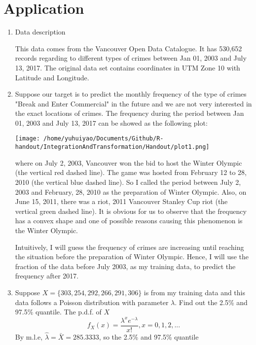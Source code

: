 \section{Application}
\begin{enumerate}
	\item Data description\cite{civ17}
	\par This data comes from the Vancouver Open Data Catalogue. It has 530,652 records regarding to different types of crimes between Jan 01, 2003 and July 13, 2017. The original data set contains coordinates in UTM Zone 10 with Latitude and Longitude. 
	\item Suppose our target is to predict the monthly frequency of the type of crimes "Break and Enter Commercial" in the future and we are not very interested in the exact locations of crimes. The frequency during the period between Jan 01, 2003 and July 13, 2017 can be showed as the following plot:
	\begin{center}
		\texttt{[image: /home/yuhuiyao/Documents/Github/R-handout/IntegrationAndTransformation/Handout/plot1.png]}
	\end{center}
	where on July 2, 2003, Vancouver won the bid to host the Winter Olympic (the vertical red dashed line). The game was hosted from February 12 to 28, 2010 (the vertical blue dashed line). So I called the period between July 2, 2003 and February, 28, 2010 as the preparation of Winter Olympic. Also, on June 15, 2011, there was a riot, 2011 Vancouver Stanley Cup riot (the vertical green dashed line). It is obvious for us to observe that the frequency has a convex shape and one of possible reasons causing this phenomenon is the Winter Olympic. 
	\par Intuitively, I will guess the frequency of crimes are increasing until reaching the situation before the preparation of Winter Olympic. Hence, I will use the fraction of the data before July 2003, as my training data, to predict the frequency after 2017.
	\item
	\par Suppose $X = \{303, 254, 292, 266, 291, 306\}$ is from my training data and this data follows a Poisson distribution with parameter $\lambda$. Find out the 2.5\% and 97.5\% quantile. The p.d.f. of $X$
	\begin{equation*}
		f_X(x) = \frac{\lambda^{x}e^{-\lambda}}{x!} , x = 0, 1, 2, ...
	\end{equation*}
	By m.l.e, $\hat{\lambda} = \bar{X} = 285.3333$, so the 2.5\% and 97.5\% quantile
	\begin{equation*}

\end{equation*}
\end{enumerate}

